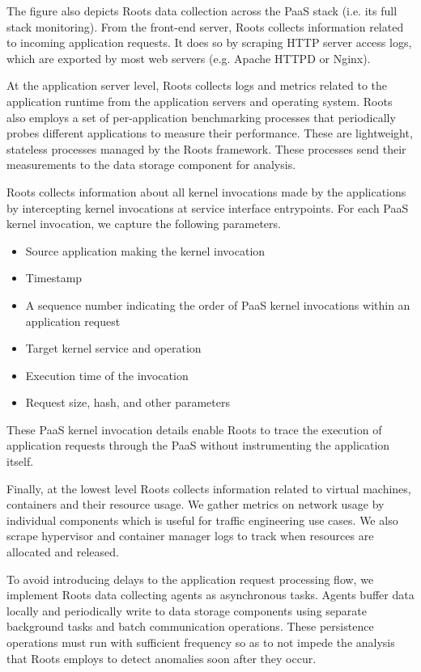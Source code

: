 The figure also depicts Roots data collection across the
PaaS stack (i.e. its full stack monitoring). 
From the front-end server, Roots collects
information related to incoming application
requests. It does so by scraping HTTP server access logs, which are
exported by most web servers (e.g. Apache HTTPD or Nginx). 

At the application server level, Roots collects logs and 
metrics related to the application runtime from 
the application servers and operating system.
Roots also employs a set of per-application benchmarking 
processes that periodically probes 
different applications
to measure their performance. These are lightweight, stateless processes 
managed by the Roots framework.
These processes send their measurements to
the data storage component for analysis.

Roots collects information about all kernel invocations
made by the applications by intercepting kernel invocations at 
service interface entrypoints.  For each PaaS kernel invocation, 
we capture the following parameters.
\begin{itemize}
\item Source application making the kernel invocation
\item Timestamp
\item A sequence number indicating the order of PaaS kernel invocations within an application request
\item Target kernel service and operation
\item Execution time of the invocation
\item Request size, hash, and other parameters
\end{itemize}
These PaaS kernel invocation details enable Roots
to trace the execution of application 
requests through the PaaS without instrumenting the application itself.

Finally, at the lowest level Roots collects information 
related to virtual machines, containers
and their resource usage. We gather metrics on network usage 
by individual components which
is useful for traffic engineering use cases. 
We also scrape
hypervisor and container manager logs to track when
resources are allocated and released.

To avoid introducing delays to the application 
request processing flow, we implement
Roots data collecting agents as asynchronous tasks. 
Agents buffer data locally and periodically write to
data storage components using separate background tasks 
and batch communication
operations. These persistence operations must run 
with sufficient frequency so as to not impede the analysis
that Roots employs to 
detect anomalies soon after they occur.

